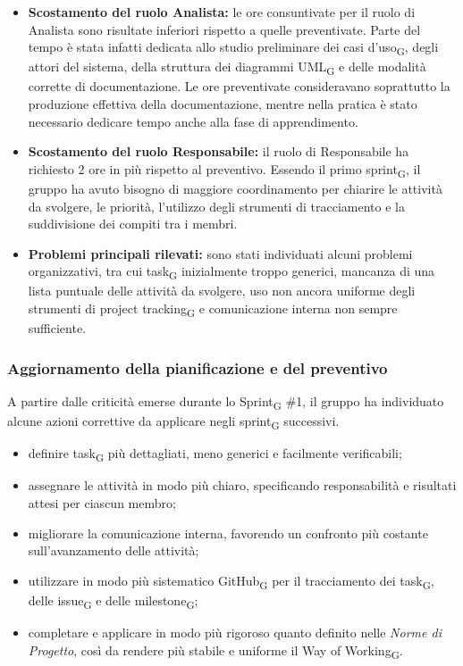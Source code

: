 \documentclass[a4paper, 10pt, colorlinks=true, linkcolor=black, urlcolor=blue, citecolor=blue, hidelinks]{article}
\begin{document}
\begin{itemize}
    \item \textbf{Scostamento del ruolo Analista:}
    le ore consuntivate per il ruolo di Analista sono risultate inferiori rispetto a quelle preventivate. 
    Parte del tempo è stata infatti dedicata allo studio preliminare dei casi d'uso\textsubscript{G}, degli attori del sistema, della struttura dei diagrammi UML\textsubscript{G} e delle modalità corrette di documentazione. 
    Le ore preventivate consideravano soprattutto la produzione effettiva della documentazione, mentre nella pratica è stato necessario dedicare tempo anche alla fase di apprendimento.

    \item \textbf{Scostamento del ruolo Responsabile:}
    il ruolo di Responsabile ha richiesto 2 ore in più rispetto al preventivo. 
    Essendo il primo sprint\textsubscript{G}, il gruppo ha avuto bisogno di maggiore coordinamento per chiarire le attività da svolgere, le priorità, l'utilizzo degli strumenti di tracciamento e la suddivisione dei compiti tra i membri.

    \item \textbf{Problemi principali rilevati:}
    sono stati individuati alcuni problemi organizzativi, tra cui task\textsubscript{G} inizialmente troppo generici, mancanza di una lista puntuale delle attività da svolgere, uso non ancora uniforme degli strumenti di project tracking\textsubscript{G} e comunicazione interna non sempre sufficiente.
\end{itemize}

\subsubsection{Aggiornamento della pianificazione e del preventivo}
A partire dalle criticità emerse durante lo Sprint\textsubscript{G} \#1, il gruppo ha individuato alcune azioni correttive da applicare negli sprint\textsubscript{G} successivi.

\begin{itemize}
    \item definire task\textsubscript{G} più dettagliati, meno generici e facilmente verificabili;
    \item assegnare le attività in modo più chiaro, specificando responsabilità e risultati attesi per ciascun membro;
    \item migliorare la comunicazione interna, favorendo un confronto più costante sull'avanzamento delle attività;
    \item utilizzare in modo più sistematico GitHub\textsubscript{G} per il tracciamento dei task\textsubscript{G}, delle issue\textsubscript{G} e delle milestone\textsubscript{G};
    \item completare e applicare in modo più rigoroso quanto definito nelle \textit{Norme di Progetto}, così da rendere più stabile e uniforme il Way of Working\textsubscript{G}.
\end{itemize}
\end{document}
